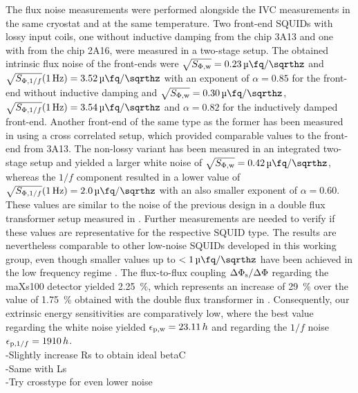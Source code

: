 The flux noise measurements were performed alongside the IVC measurements in the same cryostat and at the same temperature. Two front-end SQUIDs with lossy input coils, one without inductive damping from the chip 3A13 and one with from the chip 2A16, were measured in a two-stage setup. The obtained intrinsic flux noise of the front-ends were  $\sqrt{S_{\rm \Phi,w}}=\qty{0.23}{\micro\fq\per\sqrthz}$ and $\sqrt{S_{{\rm \Phi},1/f}}(\qty{1}{\Hz})=\qty{3.52}{\micro\fq\per\sqrthz}$ with an exponent of $\alpha=0.85$ for the front-end without inductive damping and $\sqrt{S_{\rm \Phi,w}}=\qty{0.30}{\micro\fq\per\sqrthz}$, $\sqrt{S_{{\rm \Phi},1/f}}(\qty{1}{\Hz})=\qty{3.54}{\micro\fq\per\sqrthz}$ and $\alpha=0.82$ for the inductively damped front-end. Another front-end of the same type as the former has been measured in \cite{Mazibrada2024} using a cross correlated setup, which provided comparable values to the front-end from 3A13. The non-lossy variant has been measured in an integrated two-stage setup and yielded a larger white noise of $\sqrt{S_{\rm \Phi,w}}=\qty{0.42}{\micro\fq\per\sqrthz}$, whereas the $1/f$ component resulted in a lower value of $\sqrt{S_{{\rm \Phi},1/f}}(\qty{1}{\Hz})=\qty{2.0}{\micro\fq\per\sqrthz}$ with an also smaller exponent of $\alpha=0.60$. These values are similar to the noise of the previous design in a double flux transformer setup measured in \cite{Bauer2022}. Further measurements are needed to verify if these values are representative for the respective SQUID type. The results are nevertheless comparable to other low-noise SQUIDs developed in this working group, even though smaller values up to $<\qty{1}{\micro\fq\per\sqrthz}$ have been achieved in the low frequency regime \cite{Ferring2015}. The flux-to-flux coupling $\Delta\Phi_{\rm s}/\Delta\Phi$ regarding the maXs100 detector yielded \qty{2.25}{\percent}, which represents an increase of \qty{29}{\percent} over the value of \qty{1.75}{\percent} obtained with the double flux transformer in \cite{Bauer2022}. Consequently, our extrinsic energy sensitivities are comparatively low, where the best value regarding the white noise yielded $\epsilon_{\rm p,w}=23.11\, h$ and regarding the $1/f$ noise $\epsilon_{{\rm p}, 1/f}=1910\, h$. \\



-Slightly increase Rs to obtain ideal betaC \\
-Same with Ls \\
-Try crosstype for even lower noise